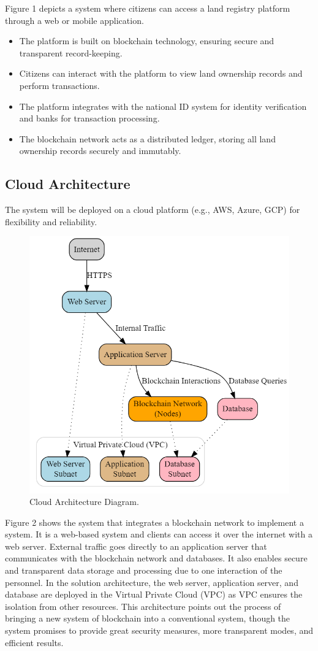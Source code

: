 \documentclass[conference]{IEEEtran}
\begin{document}
Figure 1 depicts a system where citizens can access a land registry platform through a web or mobile application.

\begin{itemize}
    \item The platform is built on blockchain technology, ensuring secure and transparent record-keeping.
    \item Citizens can interact with the platform to view land ownership records and perform transactions.
    \item The platform integrates with the national ID system for identity verification and banks for transaction processing.
    \item The blockchain network acts as a distributed ledger, storing all land ownership records securely and immutably.
\end{itemize}

\subsection{Cloud Architecture}
The system will be deployed on a cloud platform (e.g., AWS, Azure, GCP) for flexibility and reliability.

\begin{figure}[H]
    \centerline{\includegraphics[width=0.8\linewidth]{fig2.png}}
    \caption{Cloud Architecture Diagram.}
    \label{fig2}
\end{figure}

Figure 2 shows the system that integrates a blockchain network to implement a system. It is a web-based system and clients can access it over the internet with a web server. External traffic goes directly to an application server that communicates with the blockchain network and databases. It also enables secure and transparent data storage and processing due to one interaction of the personnel. In the solution architecture, the web server, application server, and database are deployed in the Virtual Private Cloud (VPC) as VPC ensures the isolation from other resources. This architecture points out the process of bringing a new system of blockchain into a conventional system, though the system promises to provide great security measures, more transparent modes, and efficient results.
\end{document}
